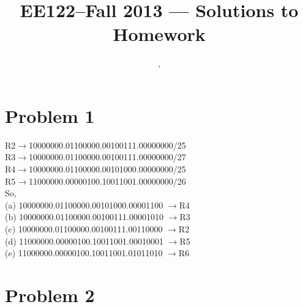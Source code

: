 \documentclass[11pt]{article}
\title{EE122--Fall 2013 --- Solutions to Homework \Homework}
\author{\Name, \texttt{\Login}}
\begin{document}
\maketitle

\section*{Problem 1}
R2$\to$10000000.01100000.00100111.00000000/25\\
R3$\to$10000000.01100000.00100111.00000000/27\\
R4$\to$10000000.01100000.00101000.00000000/25\\
R5$\to$11000000.00000100.10011001.00000000/26\\
So, \\
(a) 10000000.01100000.00101000.00001100 $\to$R4\\
(b) 10000000.01100000.00100111.00001010 $\to$R3\\
(c) 10000000.01100000.00100111.00110000 $\to$R2\\
(d) 11000000.00000100.10011001.00010001 $\to$R5\\
(e) 11000000.00000100.10011001.01011010 $\to$R6
\label{pg:end-of-p1}






%
\newpage


\pagestyle{plain}
\section*{Problem 2}
\end{document}
